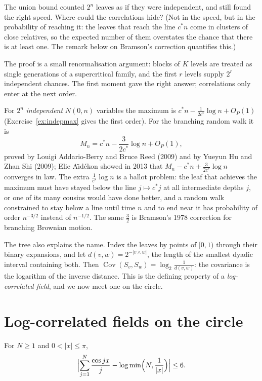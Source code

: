 \begin{think}
The union bound counted $2^n$ leaves as if they were independent, and still found the right speed. Where could the correlations hide? (Not in the speed, but in the probability of reaching it: the leaves that reach the line $c^*n$ come in clusters of close relatives, so the expected number of them overstates the chance that there is at least one. The remark below on Bramson's correction quantifies this.)
\end{think}

The proof is a small renormalisation argument: blocks of $K$ levels are treated as single generations of a supercritical family, and the first $r$ levels supply $2^r$ independent chances. The first moment gave the right
answer; correlations only enter at the next order.

\begin{remark}
For $2^n$ \emph{independent} $N(0,n)$ variables the maximum is $c^*n-\frac1{2c^*}\log n+O_P(1)$ (Exercise~\ref{ex:indepmax} gives the first order). For the branching random walk it is
\[
M_n=c^*n-\frac3{2c^*}\log n+O_P(1),
\]
proved by Louigi Addario-Berry and Bruce Reed (2009) and by Yueyun Hu and Zhan Shi (2009); Elie A\"\i d\'ekon showed in 2013 that $M_n-c^*n+\frac3{2c^*}\log n$ converges in law. The extra $\frac1{c^*}\log n$ is a ballot problem: the leaf
that achieves the maximum must have stayed below the line $j\mapsto c^*j$ at all intermediate depths $j$, or one of its many cousins would have done better, and a random walk constrained to stay below a line until time $n$ and
to end near it has probability of order $n^{-3/2}$ instead of $n^{-1/2}$. The same $\frac32$ is Bramson's 1978 correction for branching Brownian motion.
\end{remark}

The tree also explains the name. Index the leaves by points of $[0,1)$ through their binary expansions, and let $d(v,w)=2^{-|v\wedge w|}$, the length of the smallest dyadic interval containing both. Then
$\operatorname{Cov}(S_v,S_w)=\log_2\frac1{d(v,w)}$: the covariance is the logarithm of the inverse distance. This is the defining property of a \emph{log-correlated field}, and we now meet one on the circle.

\section{Log-correlated fields on the circle}

\begin{lemma}\label{lem:cosine}
For $N\ge1$ and $0<|x|\le\pi$,
\[
\Bigl|\sum_{j=1}^N\frac{\cos jx}j-\log\min\Bigl(N,\frac1{|x|}\Bigr)\Bigr|\le6 .
\]
\end{lemma}

